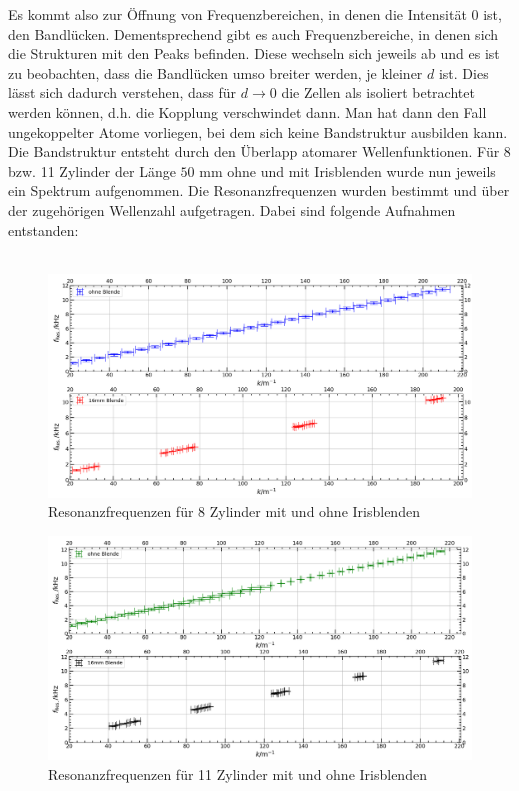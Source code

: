 \documentclass[german,  %
parskip=full,  %
]{scrartcl}
\begin{document}
\newpage
Es kommt also zur Öffnung von Frequenzbereichen, in denen die Intensität $0$ ist, den Bandlücken. Dementsprechend gibt es auch Frequenzbereiche, in denen sich die Strukturen mit den Peaks befinden. Diese wechseln sich jeweils ab und es ist zu beobachten, dass die Bandlücken umso breiter werden, je kleiner $d$ ist. Dies lässt sich dadurch verstehen, dass für \(d\rightarrow 0\) die Zellen als isoliert betrachtet werden können, d.h. die Kopplung verschwindet dann. Man hat dann den Fall ungekoppelter Atome vorliegen, bei dem sich keine Bandstruktur ausbilden kann. Die Bandstruktur entsteht durch den Überlapp atomarer Wellenfunktionen.
Für 8 bzw. 11 Zylinder der Länge $50$ mm ohne und mit Irisblenden wurde nun jeweils ein Spektrum aufgenommen. Die Resonanzfrequenzen wurden bestimmt und über der zugehörigen Wellenzahl aufgetragen. Dabei sind folgende Aufnahmen entstanden:
\\\\
\begin{figure}[h!]
\centering
\includegraphics[width=\textwidth]{4614_400mm_mit_und_ohne_Blende.png}
\caption{Resonanzfrequenzen für 8 Zylinder mit und ohne Irisblenden}
\end{figure}
\newpage
\begin{figure}[h!]
\centering
\includegraphics[width=\textwidth]{4615_600mm_mit_und_ohne_Blende.png}
\caption{Resonanzfrequenzen für 11 Zylinder mit und ohne Irisblenden}
\end{figure}
\end{document}

